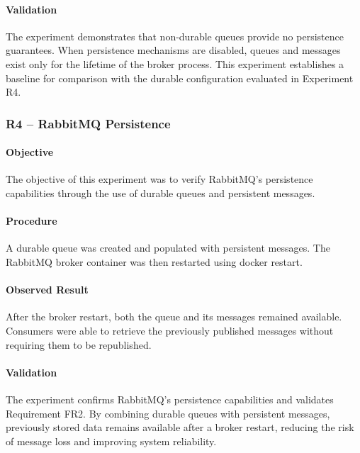 \documentclass{scrartcl}
\begin{document}
\paragraph{Validation}

The experiment demonstrates that non-durable queues provide no persistence guarantees. When persistence mechanisms are disabled, queues and messages exist only for the lifetime of the broker process. This experiment establishes a baseline for comparison with the durable configuration evaluated in Experiment R4.

\subsubsection{R4 -- RabbitMQ Persistence}

\paragraph{Objective}

The objective of this experiment was to verify RabbitMQ's persistence capabilities through the use of durable queues and persistent messages.

\paragraph{Procedure}

A durable queue was created and populated with persistent messages. The RabbitMQ broker container was then restarted using docker restart.

\paragraph{Observed Result}

After the broker restart, both the queue and its messages remained available. Consumers were able to retrieve the previously published messages without requiring them to be republished.

\paragraph{Validation}

The experiment confirms RabbitMQ's persistence capabilities and validates Requirement FR2. By combining durable queues with persistent messages, previously stored data remains available after a broker restart, reducing the risk of message loss and improving system reliability.
\end{document}
